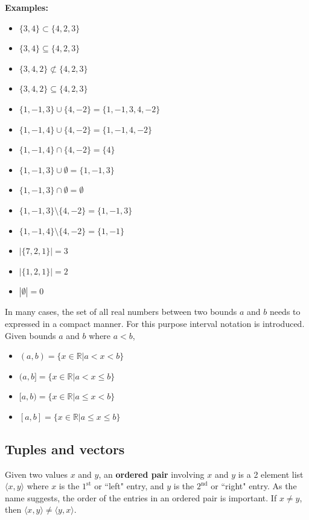 \documentclass{article}
\begin{document}
\textbf{Examples:}
\begin{itemize}
\item \(\{3, 4\} \subset \{4, 2, 3\}\)
\item \(\{3, 4\} \subseteq \{4, 2, 3\}\)
\item \(\{3, 4, 2\} \not\subset \{4, 2, 3\}\)
\item \(\{3, 4, 2\} \subseteq \{4, 2, 3\}\)
\item \(\{1, -1, 3\} \cup \{4, -2\} = \{1, -1, 3, 4, -2\}\)
\item \(\{1, -1, 4\} \cup \{4, -2\} = \{1, -1, 4, -2\}\)
\item \(\{1, -1, 4\} \cap \{4, -2\} = \{4\}\)
\item \(\{1, -1, 3\} \cup \emptyset = \{1, -1, 3\}\)
\item \(\{1, -1, 3\} \cap \emptyset = \emptyset\)
\item \(\{1, -1, 3\} \setminus \{4, -2\} = \{1, -1, 3\}\)
\item \(\{1, -1, 4\} \setminus \{4, -2\} = \{1, -1\}\)
\item \(|\{7, 2, 1\}| = 3\)
\item \(|\{1, 2, 1\}| = 2\)
\item \(|\emptyset| = 0\)
\end{itemize}

In many cases, the set of all real numbers between two bounds \(a\) and \(b\) needs to expressed in a compact manner. For this purpose interval notation is introduced. Given bounds \(a\) and \(b\) where \(a < b\),
\begin{itemize}
\item \((a, b) = \{x \in \mathbb{R} | a < x < b\}\)
\item \((a, b] = \{x \in \mathbb{R} | a < x \leq b\}\)
\item \([a, b) = \{x \in \mathbb{R} | a \leq x < b\}\)
\item \([a, b] = \{x \in \mathbb{R} | a \leq x \leq b\}\)
\end{itemize}



\subsection*{Tuples and vectors}

Given two values \(x\) and \(y\), an {\bf ordered pair} involving \(x\) and \(y\) is a 2 element list \(\langle x, y\rangle\) where \(x\) is the \(1^{\text{st}}\) or ``left" entry, and \(y\) is the \(2^{\text{nd}}\) or ``right" entry. As the name suggests, the order of the entries in an ordered pair is important. If \(x \neq y\), then \(\langle x, y \rangle \neq \langle y, x \rangle\).
\end{document}
